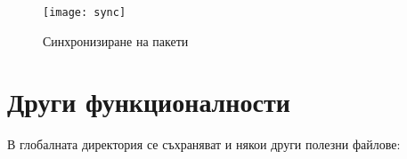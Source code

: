 \begin{figure}[H]
    \centering
    \texttt{[image: sync]}
    \caption{Синхронизиране на пакети}
    \label{fig:sync}
\end{figure}







\section{Други функционалности}

В глобалната директория се съхраняват и някои други полезни файлове:

